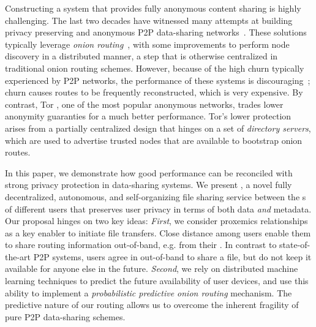 Constructing a system that provides fully anonymous content sharing is highly
challenging. The last two decades have witnessed many attempts at building privacy preserving and anonymous P2P data-sharing
networks~\cite{Clarke:2001,Gnunet2002,Freedman:2002,Nambiar:2006,Rennhard:2002}.
These solutions typically leverage \emph{onion
 routing}~\cite{Chaum:1981}, with some improvements to perform node
 discovery in a distributed manner, a step that is otherwise
centralized in traditional onion routing schemes. However, because of the high
churn typically experienced by P2P networks, the performance of these systems is
discouraging~\cite{LeBlond:2013}; churn causes routes to be frequently
reconstructed, which is very expensive. By contrast, Tor
\cite{Dingledine:2004}, one of the most popular anonymous networks,
trades lower anonymity guaranties for a much better performance. Tor's lower protection arises from
a partially centralized design that hinges on a set of \emph{directory
servers}, which are used to advertise trusted nodes that are available to bootstrap onion
routes. 

In this paper, we demonstrate how good performance can be reconciled with strong privacy protection in data-sharing systems. We present \name{}, a novel fully decentralized, autonomous,
and self-organizing file sharing service between the \squad{}s of different users that preserves user privacy
in terms of both data \emph{and} metadata. Our proposal hinges on two key ideas: \emph{First}, we consider proxemics relationships as a key enabler to initiate file
transfers. Close distance among users enable them to share
routing information out-of-band, e.g. from their
\squad. In contrast to state-of-the-art P2P systems, users agree in \name out-of-band to share a file, but
do not keep it available for anyone else in the future. \emph{Second}, we
rely on distributed machine learning techniques to predict the future
availability of user devices, and use this ability to implement a \emph{probabilistic predictive onion routing} mechanism. The predictive nature of our routing allows us to overcome the inherent fragility of pure P2P data-sharing schemes.


